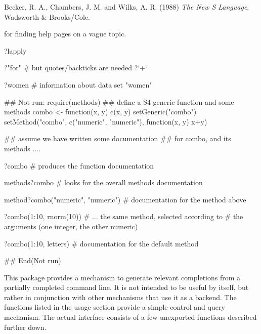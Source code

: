 %
\begin{References}\relax
Becker, R. A., Chambers, J. M. and Wilks, A. R. (1988)
\emph{The New S Language}.
Wadsworth \& Brooks/Cole.
\end{References}
%
\begin{SeeAlso}\relax
{}

 for finding help pages on a vague topic.
\end{SeeAlso}
%
\begin{Examples}
\begin{ExampleCode}
?lapply

?"for"                  # but quotes/backticks are needed
?`+`

?women                  # information about data set "women"

## Not run: 
require(methods)
## define a S4 generic function and some methods
combo <- function(x, y) c(x, y)
setGeneric("combo")
setMethod("combo", c("numeric", "numeric"), function(x, y) x+y)

## assume we have written some documentation
## for combo, and its methods ....

?combo  # produces the function documentation

methods?combo  # looks for the overall methods documentation

method?combo("numeric", "numeric")  # documentation for the method above

?combo(1:10, rnorm(10))  # ... the same method, selected according to
                         # the arguments (one integer, the other numeric)

?combo(1:10, letters)    # documentation for the default method

## End(Not run)
\end{ExampleCode}
\end{Examples}
%
\begin{Description}\relax
This package provides a mechanism to generate relevant completions
from a partially completed command line.  It is not intended to be
useful by itself, but rather in conjunction with other mechanisms that
use it as a backend.  The functions listed in the usage section
provide a simple control and query mechanism.  The actual interface
consists of a few unexported functions described further down.
\end{Description}
